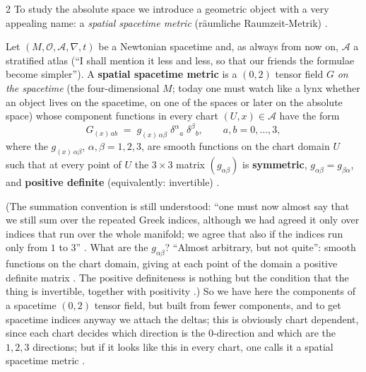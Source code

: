 \begin{paracol}{2}
To study the absolute space we introduce a geometric object with a very appealing name: a \emph{spatial spacetime metric} (r\"aumliche Raumzeit-Metrik) .
\begin{definition}\label{def:as-G}
Let $(M,\mathcal O,\mathcal A,\nabla,t)$ be a Newtonian spacetime and, as always from now on, $\mathcal A$ a stratified atlas (``I shall mention it less and less, so that our friends the formulae become simpler'').
A \textbf{spatial spacetime metric} is a $(0,2)$ tensor field $G$ \emph{on the spacetime} (the four-dimensional $M$; today one must watch like a lynx whether an object lives on the spacetime, on one of the spaces or later on the absolute space)
whose component functions in every chart $(U,x)\in\mathcal A$ have the form
\begin{equation}\label{eq:as-G}
  G_{(x)\,ab}\;=\;g_{(x)\,\alpha\beta}\;\delta^\alpha{}_a\;\delta^\beta{}_b ,\qquad a,b=0,\dots,3 ,
\end{equation}
where the $g_{(x)\,\alpha\beta}$, $\alpha,\beta=1,2,3$, are smooth functions on the chart domain $U$ such that at every point of $U$ the $3\times3$ matrix $(g_{\alpha\beta})$ is \textbf{symmetric}, $g_{\alpha\beta}=g_{\beta\alpha}$, and \textbf{positive definite}
(equivalently: invertible) .
\end{definition}
(The summation convention is still understood: ``one must now almost say that we still sum over the repeated Greek indices, although we had agreed it only over indices that run over the whole manifold; we agree that also if the indices run only from $1$ to $3$''
. What are the $g_{\alpha\beta}$? ``Almost arbitrary, but not quite'': smooth functions on the chart domain, giving at each point of the domain a positive definite matrix . The positive definiteness is nothing but the condition
that the thing is invertible, together with positivity .)
So we have here the components of a spacetime $(0,2)$ tensor field, but built from fewer components, and to get spacetime indices anyway we attach the deltas; this is obviously chart dependent, since each chart decides which direction is the $0$-direction and which are the $1,2,3$
directions; but if it looks like this in every chart, one calls it a spatial spacetime metric .


\end{paracol}
